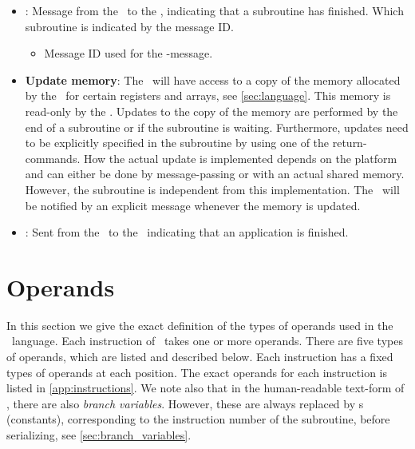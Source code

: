 \begin{itemize}
\begin{itemize}
        \end{itemize}
  \item {}:
        Message from the \QNPU\ to the \host, indicating that a subroutine has finished.
        Which subroutine is indicated by the message ID.
        \begin{itemize}
            \item {} Message ID used for the -message.
        \end{itemize}
  \item \textbf{Update memory}:
        The \host\ will have access to a copy of the memory allocated by the \QNPU\ for certain registers and arrays, see \cref{sec:language}.
        This memory is read-only by the \host.
        Updates to the copy of the memory are performed by the end of a subroutine or if the subroutine is waiting.
        Furthermore, updates need to be explicitly specified in the subroutine by using one of the return-commands.
        How the actual update is implemented depends on the platform and can either be done by message-passing or with an actual shared memory.
        However, the subroutine is independent from this implementation.
        The \host\ will be notified by an explicit message whenever the memory is updated.
  \item {}:
        Sent from the \host\ to the \QNPU\ indicating that an application is finished.
\end{itemize}


\section{Operands}\label{sec:operands}
In this section we give the exact definition of the types of operands used in the \netqasm\ language.
Each instruction of \netqasm\ takes one or more operands.
There are five types of operands, which are listed and described below.
Each instruction has a fixed types of operands at each position.
The exact operands for each instruction is listed in \cref{app:instructions}.
We note also that in the human-readable text-form of \netqasm, there are also \textit{branch variables}.
However, these are always replaced by \IMMEDIATE{}s (constants), corresponding to the instruction number of the subroutine, before serializing, see \cref{sec:branch_variables}.

